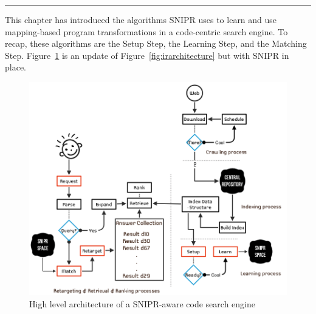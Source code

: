 \fancybreak{\pfbreakdisplay} 

This chapter has introduced the algorithms \uppercase{SNIPR} uses to learn and use mapping-based program transformations in a code-centric search engine. To recap, these algorithms are the Setup Step, the Learning Step, and the Matching Step. Figure~\ref{fig:updatearchitecture} is an update of Figure~\ref{fig:irarchitecture} but with \uppercase{SNIPR} in place. 

\begin{figure}[!ht]
    \centering
    \includegraphics[width=\textwidth]{images/wheresnipr}
    \caption{High level architecture of a SNIPR-aware code search engine}
    \label{fig:updatearchitecture}
\end{figure}
